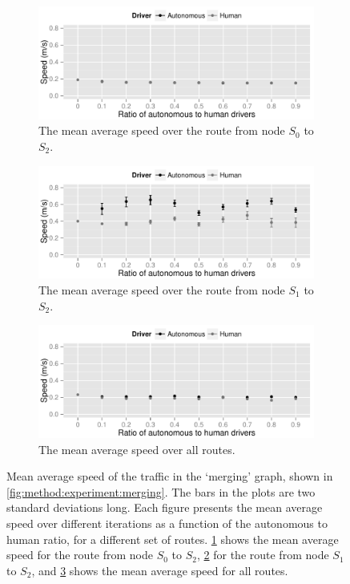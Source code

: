 \begin{figure}
	\centering
	\begin{subfigure}{\textwidth}
		\centering
		\includegraphics[width=\textwidth]{./img/results_merging_03}
		\caption{The mean average speed over the route from node $S_0$ to $S_2$.}
		\label{fig:results:merging:03}
	\end{subfigure}
	\begin{subfigure}{\textwidth}
		\centering
		\includegraphics[width=\textwidth]{./img/results_merging_13}
		\caption{The mean average speed over the route from node $S_1$ to $S_2$.}
		\label{fig:results:merging:13}
	\end{subfigure}	
	\begin{subfigure}{\textwidth}
		\centering
		\includegraphics[width=\textwidth]{./img/results_merging}
		\caption{The mean average speed over all routes.}
		\label{fig:results:merging:all}
	\end{subfigure}		
	\caption{Mean average speed of the traffic in the `merging' graph, shown in \cref{fig:method:experiment:merging}. The bars in the plots are two standard deviations long. Each figure presents the mean average speed over different iterations as a function of the autonomous to human ratio, for a different set of routes. \ref{fig:results:merging:03} shows the mean average speed for the route from node $S_0$ to $S_2$, \ref{fig:results:merging:13} for the route from node $S_1$ to $S_2$, and \ref{fig:results:merging:all} shows the mean average speed for all routes.}
	\label{fig:results:merging}
\end{figure}


